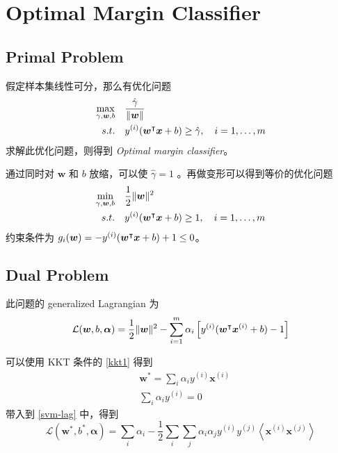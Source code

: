 \section{Optimal Margin Classifier}
	\subsection{Primal Problem}
		假定样本集线性可分，那么有优化问题
		\begin{align*}
			\max_{\gamma, \bm{w}, b}\quad & \frac{\hat{\gamma}}{\| \bm{w} \|} \\
			s.t. \quad & y^{(i)} (\bm{w^}\intercal \bm{x} + b) \geq \hat{\gamma}, \quad i = 1, \ldots, m
		\end{align*}
		求解此优化问题，则得到 \emph{Optimal margin classifier}。
		
		通过同时对 $ \bm{w} $ 和 $ b $ 放缩，可以使 $ \hat{\gamma} = 1 $ 。再做变形可以得到等价的优化问题
		\begin{align}
			\min_{\gamma, \bm{w}, b}\quad & \frac{1}{2} \| \bm{w} \| ^2 \\
			s.t. \quad & y^{(i)} (\bm{w^}\intercal \bm{x} + b) \geq 1, \quad i = 1, \ldots, m
		\end{align}
		约束条件为 $ g_i(\bm{w}) = -y^{(i)} (\bm{w^}\intercal \bm{x} + b) + 1 \leq 0 $。
		
	\subsection{Dual Problem}
		此问题的 generalized Lagrangian 为
		\begin{equation}
			\mathcal{L}(\bm{w}, b, \bm{\alpha}) = \frac{1}{2} \| \bm{w} \| ^2 - \sum_{i=1}^m \alpha_i \left[ y^{(i)} (\bm{w^}\intercal \bm{x}^{(i)} + b) - 1 \right] \label{svm-lag}
		\end{equation}
		
		可以使用 KKT 条件的 \eqref{kkt1} 得到
		\begin{align}
			&\bm{w}^* = \sum_i{\alpha_i y^{(i)} \bm{x}^{(i)}} \label{svm-kkt1-1} \\ 
			&\sum_i{\alpha_i y^{(i)}} = 0 \label{svm-kkt1-2}
		\end{align}
		带入到 \eqref{svm-lag} 中，得到
		\begin{equation*}
			\mathcal{L}(\bm{w}^*, b^*, \bm{\alpha}) = \sum_i{\alpha_i} - \frac{1}{2} \sum_i \sum_j {\alpha_i \alpha_j y^{(i)} y^{(j)} \left\langle \bm{x}^{(i)} \bm{x}^{(j)} \right\rangle }
		\end{equation*}
		

